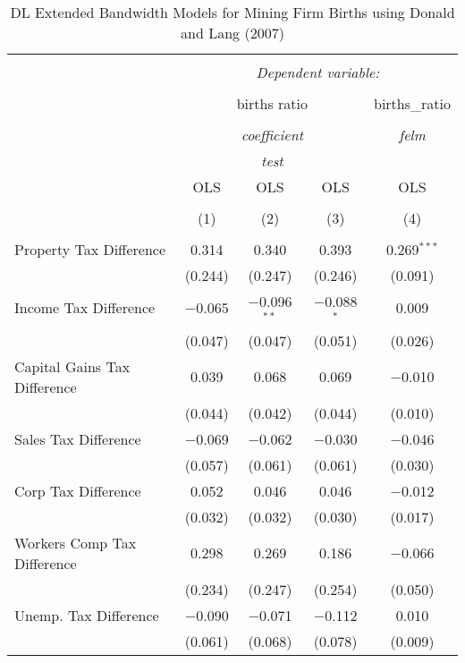
\begin{table}[!htbp] \centering 
  \caption{DL Extended Bandwidth Models for  Mining Firm Births using Donald and Lang (2007)} 
  \label{} 
\begin{tabular}{@{\extracolsep{5pt}}lcccc} 
\\[-1.8ex]\hline 
\hline \\[-1.8ex] 
 & \multicolumn{4}{c}{\textit{Dependent variable:}} \\ 
\cline{2-5} 
\\[-1.8ex] & \multicolumn{3}{c}{births ratio} & births\_ratio \\ 
\\[-1.8ex] & \multicolumn{3}{c}{\textit{coefficient}} & \textit{felm} \\ 
 & \multicolumn{3}{c}{\textit{test}} & \textit{} \\ 
 & OLS & OLS & OLS & OLS \\ 
\\[-1.8ex] & (1) & (2) & (3) & (4)\\ 
\hline \\[-1.8ex] 
 Property Tax Difference & 0.314 & 0.340 & 0.393 & 0.269$^{***}$ \\ 
  & (0.244) & (0.247) & (0.246) & (0.091) \\ 
  Income Tax Difference & $-$0.065 & $-$0.096$^{**}$ & $-$0.088$^{*}$ & 0.009 \\ 
  & (0.047) & (0.047) & (0.051) & (0.026) \\ 
  Capital Gains Tax Difference & 0.039 & 0.068 & 0.069 & $-$0.010 \\ 
  & (0.044) & (0.042) & (0.044) & (0.010) \\ 
  Sales Tax Difference & $-$0.069 & $-$0.062 & $-$0.030 & $-$0.046 \\ 
  & (0.057) & (0.061) & (0.061) & (0.030) \\ 
  Corp Tax Difference & 0.052 & 0.046 & 0.046 & $-$0.012 \\ 
  & (0.032) & (0.032) & (0.030) & (0.017) \\ 
  Workers Comp Tax Difference & 0.298 & 0.269 & 0.186 & $-$0.066 \\ 
  & (0.234) & (0.247) & (0.254) & (0.050) \\ 
  Unemp. Tax Difference & $-$0.090 & $-$0.071 & $-$0.112 & 0.010 \\ 
  & (0.061) & (0.068) & (0.078) & (0.009) \\ 

\end{tabular}
\end{table}
